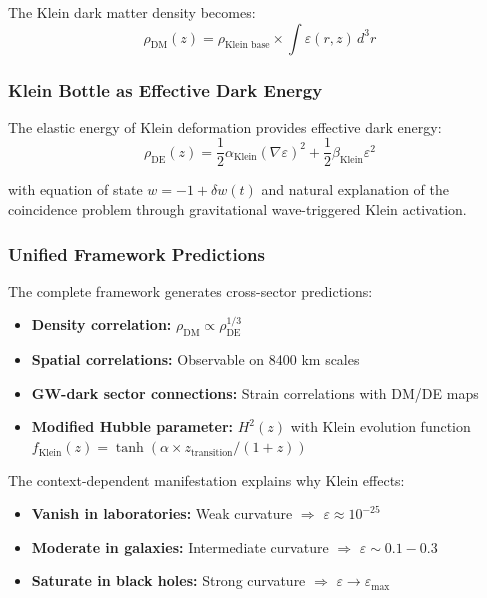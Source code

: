 \documentclass[12pt]{iopart}
\begin{document}
The Klein dark matter density becomes:
\begin{equation}
\rho_{\text{DM}}(z) = \rho_{\text{Klein base}} \times \int \varepsilon(r,z) \, d^3r
\end{equation}

\subsubsection{Klein Bottle as Effective Dark Energy}

The elastic energy of Klein deformation provides effective dark energy:
\begin{equation}
\rho_{\text{DE}}(z) = \frac{1}{2}\alpha_{\text{Klein}}(\nabla\varepsilon)^2 + \frac{1}{2}\beta_{\text{Klein}}\varepsilon^2
\end{equation}

with equation of state $w = -1 + \delta w(t)$ and natural explanation of the coincidence problem through gravitational wave-triggered Klein activation.

\subsubsection{Unified Framework Predictions}

The complete framework generates cross-sector predictions:
\begin{itemize}
\item \textbf{Density correlation:} $\rho_{\text{DM}} \propto \rho_{\text{DE}}^{1/3}$
\item \textbf{Spatial correlations:} Observable on 8400 km scales
\item \textbf{GW-dark sector connections:} Strain correlations with DM/DE maps
\item \textbf{Modified Hubble parameter:} $H^2(z)$ with Klein evolution function $f_{\text{Klein}}(z) = \tanh(\alpha \times z_{\text{transition}}/(1+z))$
\end{itemize}

The context-dependent manifestation explains why Klein effects:
\begin{itemize}
\item \textbf{Vanish in laboratories:} Weak curvature $\Rightarrow$ $\varepsilon \approx 10^{-25}$
\item \textbf{Moderate in galaxies:} Intermediate curvature $\Rightarrow$ $\varepsilon \sim 0.1-0.3$  
\item \textbf{Saturate in black holes:} Strong curvature $\Rightarrow$ $\varepsilon \to \varepsilon_{\max}$
\end{itemize}
\end{document}
